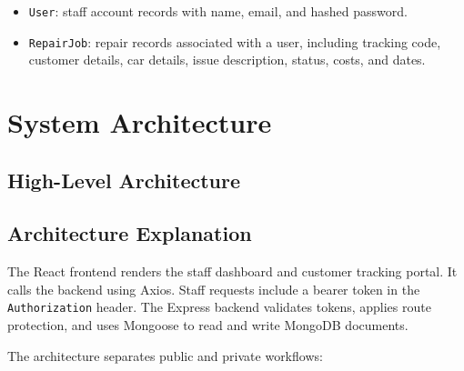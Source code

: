 \documentclass[12pt,a4paper]{report}
\begin{document}
\begin{itemize}
  \item \texttt{User}: staff account records with name, email, and hashed password.
  \item \texttt{RepairJob}: repair records associated with a user, including tracking code, customer details, car details, issue description, status, costs, and dates.
\end{itemize}

\chapter{System Architecture}

\section{High-Level Architecture}

\begin{center}
\end{center}

\section{Architecture Explanation}

The React frontend renders the staff dashboard and customer tracking portal. It calls the backend using Axios. Staff requests include a bearer token in the \texttt{Authorization} header. The Express backend validates tokens, applies route protection, and uses Mongoose to read and write MongoDB documents.

The architecture separates public and private workflows:
\end{document}
